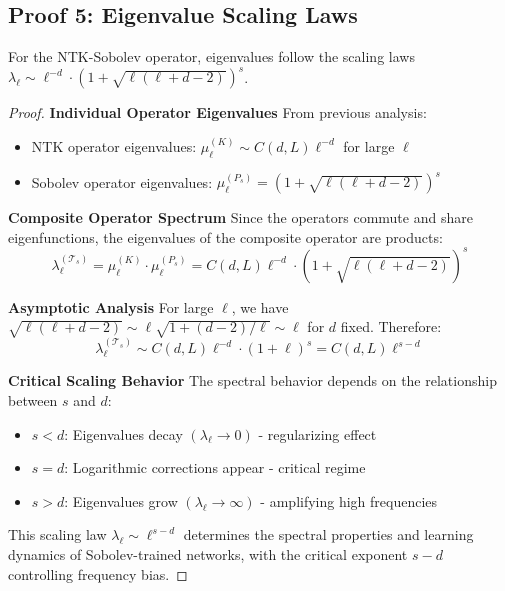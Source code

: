 \documentclass[a4paper]{article}
\begin{document}
\subsection{Proof 5: Eigenvalue Scaling Laws}

\begin{theorem}
For the NTK-Sobolev operator, eigenvalues follow the scaling laws $\lambda_\ell \sim \ell^{-d} \cdot (1 + \sqrt{\ell(\ell + d - 2)})^s$.
\end{theorem}

\begin{proof}
\textbf{Individual Operator Eigenvalues}
From previous analysis:
\begin{itemize}
\item NTK operator eigenvalues: $\mu_\ell^{(K)} \sim C(d, L) \ell^{-d}$ for large $\ell$
\item Sobolev operator eigenvalues: $\mu_\ell^{(P_s)} = (1 + \sqrt{\ell(\ell + d - 2)})^s$
\end{itemize}

\textbf{Composite Operator Spectrum}
Since the operators commute and share eigenfunctions, the eigenvalues of the composite operator are products:
\[ \lambda_\ell^{(\mathcal{T}_s)} = \mu_\ell^{(K)} \cdot \mu_\ell^{(P_s)} = C(d, L) \ell^{-d} \cdot (1 + \sqrt{\ell(\ell + d - 2)})^s \]

\textbf{Asymptotic Analysis}
For large $\ell$, we have $\sqrt{\ell(\ell + d - 2)} \sim \ell \sqrt{1 + (d-2)/\ell} \sim \ell$ for $d$ fixed. Therefore:
\[ \lambda_\ell^{(\mathcal{T}_s)} \sim C(d, L) \ell^{-d} \cdot (1 + \ell)^s = C(d, L) \ell^{s-d} \]

\textbf{Critical Scaling Behavior}
The spectral behavior depends on the relationship between $s$ and $d$:
\begin{itemize}
\item $s < d$: Eigenvalues decay $(\lambda_\ell \to 0)$ - regularizing effect
\item $s = d$: Logarithmic corrections appear - critical regime  
\item $s > d$: Eigenvalues grow $(\lambda_\ell \to \infty)$ - amplifying high frequencies
\end{itemize}

This scaling law $\lambda_\ell \sim \ell^{s-d}$ determines the spectral properties and learning dynamics of Sobolev-trained networks, with the critical exponent $s - d$ controlling frequency bias.
\end{proof}
\end{document}
